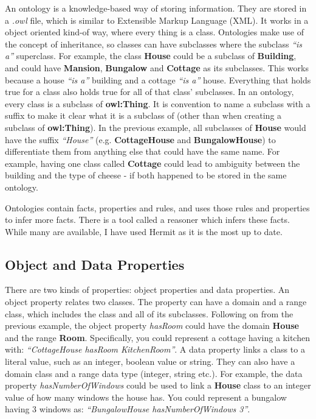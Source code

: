 An ontology is a knowledge-based way of storing information. They are stored in a \textit{.owl} file, which is similar to Extensible Markup Language (XML). It works in a object oriented kind-of way, where every thing is a class. Ontologies make use of the concept of inheritance, so classes can have subclasses where the subclass \textit{``is a''} superclass. For example, the class \textbf{House} could be a subclass of \textbf{Building}, and could have \textbf{Mansion}, \textbf{Bungalow} and \textbf{Cottage} as its subclasses. This works because a house \textit{``is a''} building and a cottage \textit{``is a''} house. Everything that holds true for a class also holds true for all of that class' subclasses. In an ontology, every class is a subclass of \textbf{owl:Thing}. It is convention to name a subclass with a suffix to make it clear what it is a subclass of (other than when creating a subclass of \textbf{owl:Thing}). In the previous example, all subclasses of \textbf{House} would have the suffix \textit{``House''} (e.g. \textbf{CottageHouse} and \textbf{BungalowHouse}) to differentiate them from anything else that could have the same name. For example, having one class called \textbf{Cottage} could lead to ambiguity between the building and the type of cheese - if both happened to be stored in the same ontology. 

Ontologies contain facts, properties and rules, and uses those rules and properties to infer more facts. There is a tool called a reasoner which infers these facts. While many are available, I have used Hermit \cite{hermit} as it is the most up to date.

\subsection{Object and Data Properties}

There are two kinds of properties: object properties and data properties. An object property relates two classes. The property can have a domain and a range class, which includes the class and all of its subclasses. Following on from the previous example, the object property \textit{hasRoom} could have the domain \textbf{House} and the range \textbf{Room}. Specifically, you could represent a cottage having a kitchen with: \textit{``CottageHouse hasRoom KitchenRoom''}. A data property links a class to a literal value, such as an integer, boolean value or string. They can also have a domain class and a range data type (integer, string etc.). For example, the data property \textit{hasNumberOfWindows} could be used to link a \textbf{House} class to an integer value of how many windows the house has. You could represent a bungalow having 3 windows as: \textit{``BungalowHouse hasNumberOfWindows 3''}. 

